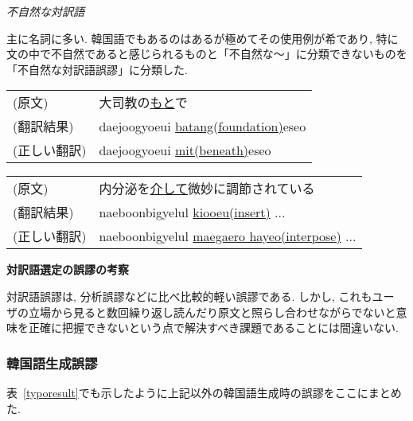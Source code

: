 \vspace{0.5cm}

\begin{flushleft}
{\it 不自然な対訳語}
\end{flushleft}

主に名詞に多い. 韓国語でもあるのはあるが極めてその使用例が希であり, 特に
文の中で不自然であると感じられるものと「不自然な〜」に分類できないものを
「不自然な対訳語誤謬」に分類した. 

\vspace{0.5cm}
\begin{tabular}{ll}
 (原文)     &  大司教の\underline{もと}で \\
 (翻訳結果)  & daejoogyoeui \underline{batang(foundation)}eseo \\
 (正しい翻訳) & daejoogyoeui \underline{mit(beneath)}eseo \\
\end{tabular}

\vspace{0.5cm}
\begin{tabular}{ll}
 (原文)     &  内分泌を\underline{介して}微妙に調節されている \\
 (翻訳結果)  & naeboonbigyelul \underline{kiooeu(insert)} ... \\
 (正しい翻訳) & naeboonbigyelul \underline{maegaero hayeo(interpose)} ... \\
\end{tabular}



\begin{flushleft}
{\bf 対訳語選定の誤謬の考察}
\end{flushleft}

対訳語誤謬は, 分析誤謬などに比べ比較的軽い誤謬である. しかし, これもユー
ザの立場から見ると数回繰り返し読んだり原文と照らし合わせながらでないと意
味を正確に把握できないという点で解決すべき課題であることには間違いない. 

\subsubsection{韓国語生成誤謬}
表~\ref{typoresult}でも示したように上記以外の韓国語生成時の誤謬をここにまとめた. 

